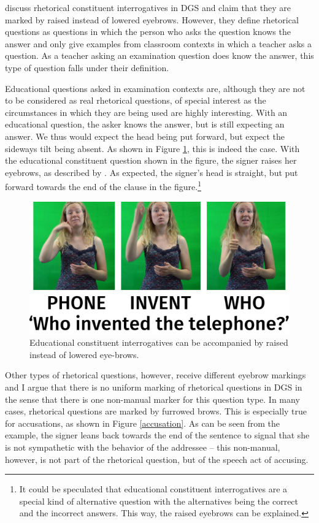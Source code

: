\citet[333]{happ2014vork} discuss rhetorical constituent interrogatives in DGS and claim that they are marked by raised instead of lowered eyebrows. However, they define rhetorical questions as questions in which the person who asks the question knows the answer and only give examples from classroom contexts in which a teacher asks a question. As a teacher asking an examination question does know the answer, this type of question falls under their definition.

Educational questions asked in examination contexts are, although they are not to be considered as real rhetorical questions, of special interest as the circumstances in which they are being used are highly interesting. With an educational question, the asker knows the answer, but is still expecting an answer. We thus would expect the head being put forward, but expect the sideways tilt being absent. As shown in Figure \ref{educational}, this is indeed the case. With the educational constituent question shown in the figure, the signer raises her eyebrows, as described by \citet{happ2014vork}. As expected, the signer's head is straight, but put forward towards the end of the clause in the figure.\footnote{ It could be speculated that educational constituent interrogatives are a special kind of alternative question with the alternatives being the correct and the incorrect answers. This way, the raised eyebrows can be explained.}

\begin{figure}[bt]
\centering
	\includegraphics[width=1.0\textwidth]{educational.jpg}
	\caption{Educational constituent interrogatives can be accompanied by raised instead of lowered eye-brows.}
	\label{educational}
\end{figure}

Other types of rhetorical questions, however, receive different eyebrow markings and I argue that there is no uniform marking of rhetorical questions in DGS in the sense that there is one non-manual marker for this question type. In many cases, rhetorical questions are marked by furrowed brows. This is especially true for accusations, as shown in Figure \ref{accusation}. As can be seen from the example, the signer leans back towards the end of the sentence to signal that she is not sympathetic with the behavior of the addressee -- this non-manual, however, is not part of the rhetorical question, but of the speech act of accusing.


